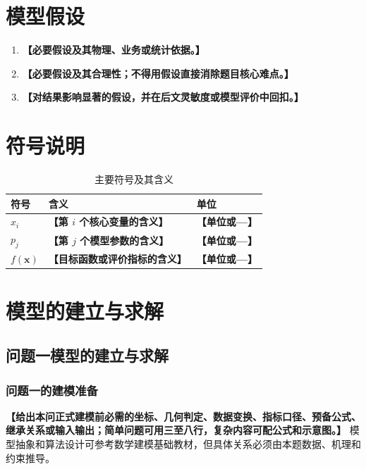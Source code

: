 \documentclass[UTF8,a4paper,12pt,zihao=-4]{ctexart}
\newcommand{\TemplateField}[1]{\textbf{【#1】}}
\begin{document}
\section{模型假设}
\begin{enumerate}[label=\textbf{假设\arabic*.}]
  \item \TemplateField{必要假设及其物理、业务或统计依据。}
  \item \TemplateField{必要假设及其合理性；不得用假设直接消除题目核心难点。}
  \item \TemplateField{对结果影响显著的假设，并在后文灵敏度或模型评价中回扣。}
\end{enumerate}

\section{符号说明}
\begin{table}[htbp]
  \centering
  \caption{主要符号及其含义}
  \label{tab:symbols}
  \begin{tabularx}{0.88\textwidth}{>{\centering\arraybackslash}p{}X>{\centering\arraybackslash}p{}}
    \toprule[1.2pt]
    符号 & 含义 & 单位 \\
    \midrule[0.8pt]
    $x_i$ & \TemplateField{第 $i$ 个核心变量的含义} & \TemplateField{单位或—} \\
    $p_j$ & \TemplateField{第 $j$ 个模型参数的含义} & \TemplateField{单位或—} \\
    $f(\symbf{x})$ & \TemplateField{目标函数或评价指标的含义} & \TemplateField{单位或—} \\
    \bottomrule[1.2pt]
  \end{tabularx}
\end{table}

\section{模型的建立与求解}

\subsection{问题一模型的建立与求解}

\subsubsection{问题一的建模准备}
\TemplateField{给出本问正式建模前必需的坐标、几何判定、数据变换、指标口径、预备公式、继承关系或输入输出；简单问题可用三至八行，复杂内容可配公式和示意图。}
模型抽象和算法设计可参考数学建模基础教材\cite{modelbook,algobook}，但具体关系必须由本题数据、机理和约束推导。
\end{document}

